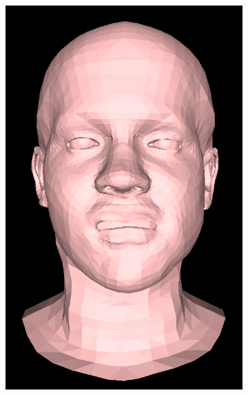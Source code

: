 \begin{figure}[h]
\begin{subfigure}[b]{0.24\textwidth}
        \includegraphics[width=\textwidth]{figures/blendshape_interp/4/00003.png}
    \end{subfigure}
    \begin{subfigure}[b]{0.24\textwidth}

\end{subfigure}
\end{figure}
